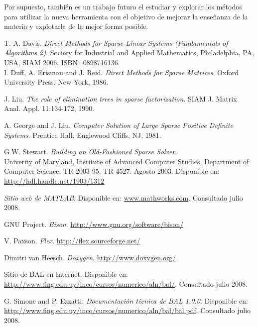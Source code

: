 \documentclass[a4paper,10pt]{article}
\begin{document}
Por supuesto, también es un trabajo futuro el estudiar y explorar los métodos para utilizar la nueva herramienta con el objetivo de mejorar la enseñanza de la materia y explotarla de la mejor forma posible.


\appendix

\begin{thebibliography}{99}

 T. A. Davis. \textit{Direct Methods for Sparse Linear Systems (Fundamentals of Algorithms 2)}.
Society for Industrial and Applied Mathematics, Philadelphia, PA, USA, SIAM 2006, ISBN=0898716136. \\

 I. Duff, A. Erisman and J. Reid.  \textit{Direct Methods for Sparse Matrices}. 
 Oxford University Press, New York, 1986. 


   J. Liu. \textit{ The role of elimination trees in sparse factorization}.
 SIAM J. Matrix Anal. Appl. 11:134-172, 1990. 

 A. George and J. Liu. 	\textit{Computer Solution of Large Sparse Positive Definite Systems}.
  Prentice Hall, Englewood Cliffs, NJ, 1981.


 G.W. Stewart. \textit{Building an Old-Fashioned Sparse Solver}.\\
Univerity of Maryland, Institute of Advanced Computer Studies, Department of Computer Science.
TR-2003-95, TR-4527. Agosto 2003. Disponible en: \url{http://hdl.handle.net/1903/1312}

 \textit{Sitio web de MATLAB}.
Disponible en: \url{www.mathworks.com}. Consultado julio 2008.

 GNU Project. \textit{Bison}. \url{http://www.gnu.org/software/bison/}

 V. Paxson. \textit{Flex}. \url{http://flex.sourceforge.net/}

 Dimitri van Heesch. \textit{Doxygen}. \url{http://www.doxygen.org/}


 Sitio de BAL en Internet.
Disponible en: \url{http://www.fing.edu.uy/inco/cursos/numerico/aln/bal/}. Consultado julio 2008.

 G. Simone and P. Ezzatti. \textit{Documentación técnica de BAL 1.0.0}.
Disponible en: \url{http://www.fing.edu.uy/inco/cursos/numerico/aln/bal/bal.pdf}. Consultado julio 2008.

\end{thebibliography}
\end{document}
